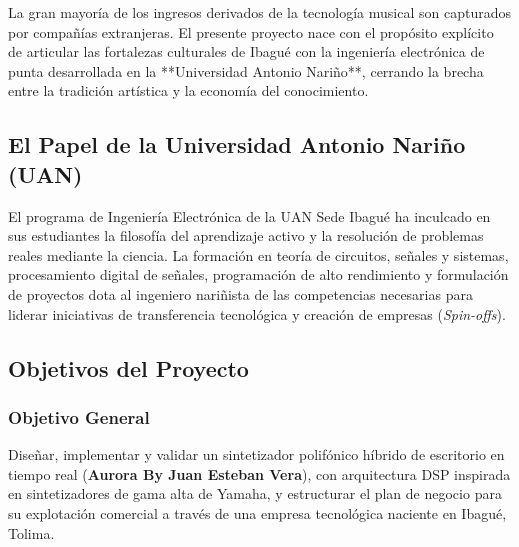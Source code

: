 \documentclass[11pt,a4paper]{article}
\begin{document}
La gran mayoría de los ingresos derivados de la tecnología musical son capturados por compañías extranjeras. El presente proyecto nace con el propósito explícito de articular las fortalezas culturales de Ibagué con la ingeniería electrónica de punta desarrollada en la **Universidad Antonio Nariño**, cerrando la brecha entre la tradición artística y la economía del conocimiento.

\subsection{El Papel de la Universidad Antonio Nariño (UAN)}
El programa de Ingeniería Electrónica de la UAN Sede Ibagué ha inculcado en sus estudiantes la filosofía del aprendizaje activo y la resolución de problemas reales mediante la ciencia. La formación en teoría de circuitos, señales y sistemas, procesamiento digital de señales, programación de alto rendimiento y formulación de proyectos dota al ingeniero nariñista de las competencias necesarias para liderar iniciativas de transferencia tecnológica y creación de empresas (\textit{Spin-offs}).

\subsection{Objetivos del Proyecto}

\subsubsection{Objetivo General}
Diseñar, implementar y validar un sintetizador polifónico híbrido de escritorio en tiempo real (\textbf{Aurora By Juan Esteban Vera}), con arquitectura DSP inspirada en sintetizadores de gama alta de Yamaha, y estructurar el plan de negocio para su explotación comercial a través de una empresa tecnológica naciente en Ibagué, Tolima.
\end{document}
